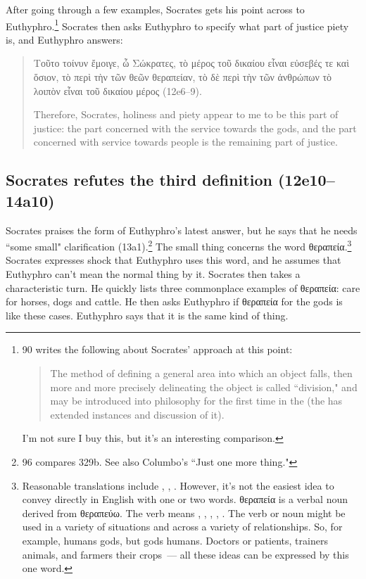 \documentclass[11pt]{article}
\begin{document}
After going through a few examples, Socrates gets his point across to
Euthyphro.\footnote{\citet{bailly2003} 90 writes the following about
Socrates' approach at this point:

\begin{quote}
    The method of defining a general area into which an object falls, then
    more and more precisely delineating the object is called ``division,"
    and may be introduced into philosophy for the first time in the
     (the  has extended instances and
    discussion of it).
\end{quote}

I'm not sure I buy this, but it's an interesting comparison.}  Socrates
then asks Euthyphro to specify what part of justice piety is, and Euthyphro
answers:

\begin{quote}
    Τοῦτο τοίνυν ἔμοιγε, ὦ Σώκρατες, τὸ μέρος τοῦ δικαίου εἶναι εὐσεβές τε
    καὶ ὅσιον, τὸ περὶ τὴν τῶν θεῶν θεραπείαν, τὸ δὲ περὶ τὴν τῶν ἀνθρώπων
    τὸ λοιπὸν εἶναι τοῦ δικαίου μέρος (12e6--9).

    Therefore, Socrates, holiness and piety appear to me to be this part of
    justice: the part concerned with the service towards the gods, and the
    part concerned with service towards people is the remaining part of
    justice.
\end{quote}

\subsection{Socrates refutes the third definition (12e10--14a10)}

Socrates praises the form of Euthyphro's latest answer, but he says that he
needs ``some small" clarification (13a1).\footnote{\citet{bailly2003} 96
compares  329b.  See also Columbo's ``Just one more
thing."}  The small thing concerns the word θεραπεία.\footnote{Reasonable
translations include , , .
However, it's not the easiest idea to convey directly in English with one
or two words.  θεραπεία is a verbal noun derived from θεραπεύω.  The verb
means , , , ,
.  The verb or noun might be used in a variety of
situations and across a variety of relationships.  So, for example, humans
 gods, but gods  humans.  Doctors
 or  patients, trainers  animals,
and farmers  their crops~--- all these ideas can be expressed
by this one word.}  Socrates expresses shock that Euthyphro uses this word,
and he assumes that Euthyphro can't mean the normal thing by it.  Socrates
then takes a characteristic turn.  He quickly lists three commonplace
examples of θεραπεία: care for horses, dogs and cattle.  He then asks
Euthyphro if θεραπεία for the gods is like these cases.  Euthyphro says
that it is the same kind of thing.
\end{document}
